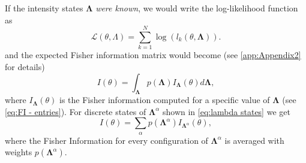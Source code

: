 If the intensity states $\bm{\Lambda}$ \emph{were known}, we would write the log-likelihood function as 
%
\begin{equation}
	\mathcal{L}(\theta,\Lambda)=\sum_{k=1}^N\log\left(l_k(\theta,\bm{\Lambda})\right).
\end{equation}
%
and the expected Fisher information matrix would become (see \autoref{app:Appendix2} for details)
%
\begin{equation*}
	I(\theta) = \int_{\bm{\Lambda}}p(\bm{\Lambda})I_{\bm{\Lambda}}(\theta)d\bm{\Lambda},
\end{equation*}
%
where $I_{\bm{\Lambda}}(\theta)$ is the Fisher information computed for a specific value of $\bm{\Lambda}$ (see \autoref{eq:FI - entries}).
%
For discrete states of $\bm{\Lambda}^\alpha$ shown in \autoref{eq:lambda states} we get
%
\begin{equation}
	I(\theta)=\sum_{\alpha}p(\bm{\Lambda}^\alpha)I_{\bm{\Lambda}^\alpha}(\theta),
	\label{eq:FI avg}
\end{equation}
%
where the Fisher Information for every configuration of $\bm{\Lambda}^\alpha$ is averaged with weights $p(\bm{\Lambda}^\alpha)$. 




